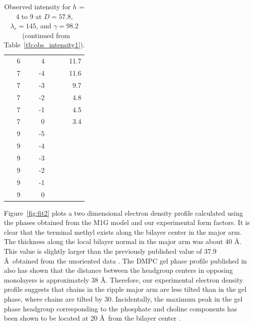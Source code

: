 \begin{table}[htbp]
\begin{tabular}{rrr}
6 & 4 & 11.7 \\ 
7 & -4 & 11.6 \\
7 & -3 & 9.7 \\ 
7 & -2 & 4.8 \\ 
7 & -1 & 4.5 \\ 
7 & 0 & 3.4 \\ 
9 & -5 & \\
9 & -4 & \\
9 & -3 & \\
9 & -2 & \\
9 & -1 & \\
9 & 0 &\\
\hline
\end{tabular}
  \caption{Observed intensity for $h$ = 4 to 9 at $D=57.8$, $\lambda_r=145$, and 
  $\gamma=98.2$\textdegree\ (continued from Table~\ref{tb:obs_intensity1}).}
  \label{tb:obs_intensity2}
\end{table}

Figure~\ref{fig:fit2} plots a two dimensional electron density profile calculated
using the phases obtained from the M1G model and our experimental form factors.
It is clear that the terminal methyl exists along the bilayer 
center in the major arm. The thickness along the local bilayer normal
in the major arm was about 40 \AA. This value is slightly larger than
the previously published value of 37.9 \AA\ obtained from the unoriented
data \cite{ref:Sun96}. The DMPC gel phase profile published in 
\cite{Tristram-Nagle02} also has shown that the distance between
the headgroup centers in opposing monolayers is approximately 38 \AA.
Therefore, our experimental
electron density profile suggests that chains in the ripple major arm are
less tilted than in the gel phase, where chains are tilted by 30\textdegree.
Incidentally, the maximum peak in the gel phase headgroup corresponding to the
phosphate and choline components has been shown to be located at 20 \AA\
from the bilayer center \cite{Tristram-Nagle02}. 

